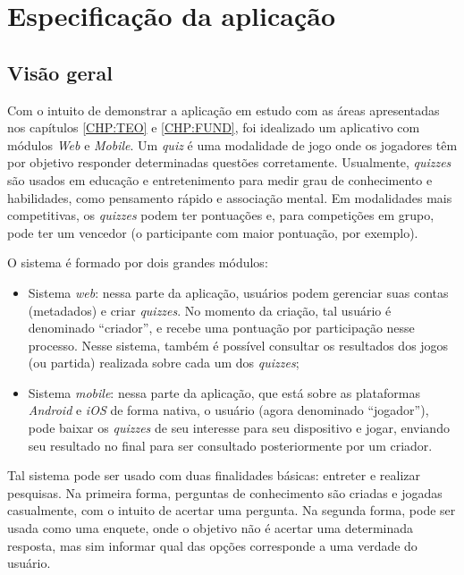 \chapter{Especificação da aplicação} \label{CHP:APP}%
 
\section{Visão geral}
Com o intuito de demonstrar a aplicação em estudo com as áreas apresentadas nos capítulos \ref{CHP:TEO} e \ref{CHP:FUND}, foi idealizado um aplicativo com módulos \emph{Web} e \emph{Mobile}.
        Um \emph{quiz} é uma modalidade de jogo onde os jogadores têm por objetivo responder determinadas questões corretamente. Usualmente, \emph{quizzes} são usados em educação e entretenimento para medir grau de conhecimento e habilidades, como pensamento rápido e associação mental. Em modalidades mais competitivas, os \emph{quizzes} podem ter pontuações e, para competições em grupo, pode ter um vencedor (o participante com maior pontuação, por exemplo).
		
		O sistema é formado por dois grandes módulos:
\begin{itemize}
\item Sistema \emph{web}: nessa parte da aplicação, usuários podem gerenciar suas contas (metadados) e criar \emph{quizzes}. No momento da criação, tal usuário é denominado ``criador'', e recebe uma pontuação por participação nesse processo. Nesse sistema, também é possível consultar os resultados dos jogos (ou partida) realizada sobre cada um dos \emph{quizzes};
\item Sistema \emph{mobile}: nessa parte da aplicação, que está sobre as plataformas \emph{Android} e \emph{iOS} de forma nativa, o usuário (agora denominado ``jogador''), pode baixar os \emph{quizzes} de seu interesse para seu dispositivo e jogar, enviando seu resultado no final para ser consultado posteriormente por um criador.
\end{itemize} 
Tal sistema pode ser usado com duas finalidades básicas: entreter e realizar pesquisas. Na primeira forma, perguntas de conhecimento são criadas e jogadas casualmente, com o intuito de acertar uma pergunta. Na segunda forma, pode ser usada como uma enquete, onde o objetivo não é acertar uma determinada resposta, mas sim informar qual das opções corresponde a uma verdade do usuário.
 
